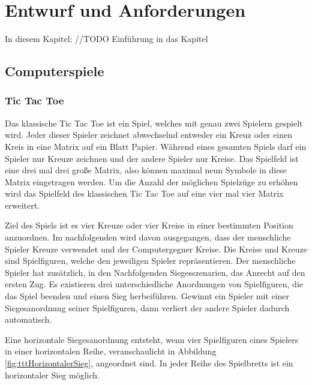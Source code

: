 \chapter{Entwurf und Anforderungen}
\label{cha:entwurfUndAnforderungen}

In diesem Kapitel: //TODO Einführung in das Kapitel

\section{Computerspiele}
\label{sec:computerspiele}

\subsection{Tic Tac Toe}
\label{sec:ttt}

Das klassische Tic Tac Toe ist ein Spiel, welches mit genau zwei Spielern gespielt wird. Jeder dieser Spieler zeichnet abwechselnd entweder ein Kreuz oder einen Kreis in eine Matrix auf ein Blatt Papier. Während eines gesamten Spiels darf ein Spieler nur Kreuze zeichnen und der andere Spieler nur Kreise. Das Spielfeld ist eine drei mal drei große Matrix, also können maximal neun Symbole in diese Matrix eingetragen werden. Um die Anzahl der möglichen Spielzüge zu erhöhen wird das Spielfeld des klassischen Tic Tac Toe auf eine vier mal vier Matrix erweitert.


Ziel des Spiels ist es vier Kreuze oder vier Kreise in einer bestimmten Position anzuordnen. Im nachfolgenden wird davon ausgegangen, dass der menschliche Spieler Kreuze verwendet und der Computergegner Kreise. Die Kreise und Kreuze sind Spielfiguren, welche den jeweiligen Spieler repräsentieren. Der menschliche Spieler hat zusätzlich, in den Nachfolgenden Siegesszenarien, das Anrecht auf den ersten Zug. Es existieren drei unterschiedliche Anordnungen von Spielfiguren, die das Spiel beenden und einen Sieg herbeiführen. Gewinnt ein Spieler mit einer Siegesanordnung seiner Spielfiguren, dann verliert der andere Spieler dadurch automatisch.

Eine horizontale Siegesanordnung entsteht, wenn vier Spielfiguren eines Spielers in einer horizontalen Reihe, veranschaulicht in Abbildung \ref{fig:tttHorizontalerSieg}, angeordnet sind. In jeder Reihe des Spielbretts ist ein horizontaler Sieg möglich.

